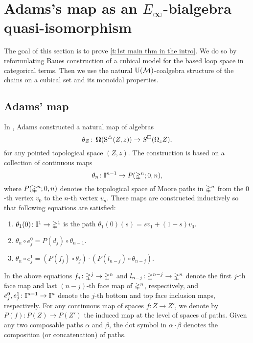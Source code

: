 
\section{Adams's map as an $E_{\infty}$-bialgebra quasi-isomorphism}

The goal of this section is to prove \cref{t:1st main thm in the intro}. We do so by reformulating Baues construction of a cubical model for the based loop space in categorical terms. Then we use the natural ${\operatorname{U}(\mathcal{M})}$-coalgebra structure of the chains on a cubical set and its monoidal properties.


\subsection{Adams' map}

In \cite{adams1956cobar}, Adams constructed a natural map of algebras
\begin{equation} \label{e:adams map 2}
\theta_Z \colon \operatorname{\mathbf{\Omega}}(\operatorname{S^{\triangle}}(Z, z)) \to S^{\square}(\Omega_z Z),
\end{equation}
for any pointed topological space $(Z, z)$.
The construction is based on a collection of continuous maps $$\theta_n \colon \mathbb{I}^{n-1} \to P(\mathbb{\Delta}^n;0,n),$$
where $P(\mathbb{\Delta}^n;0,n)$ denotes the topological space of Moore paths in $\mathbb{\Delta}^n$ from the $0$-th vertex $v_0$ to the $n$-th vertex $v_n$.
These maps are constructed inductively so that following equations are satisfied:
\begin{enumerate}
	\item $\theta_1(0)\colon \mathbb{I}^1 \to \mathbb{\Delta}^1$ is the path $\theta_1(0)(s) = sv_1 +(1-s)v_0$.
	\item $\theta_n \circ e_j^0 = P(d_j) \circ \theta_{n-1}$.
	\item $\theta_n \circ e_j^1 = (P(f_j) \circ \theta_j) \cdot (P(l_{n-j}) \circ \theta_{n-j})$.
\end{enumerate}
In the above equations $f_j\colon \mathbb{\Delta}^j \rightarrow \mathbb{\Delta}^n$ and $l_{n-j}\colon \mathbb{\Delta}^{n-j} \rightarrow \mathbb{\Delta}^n$ denote the first $j$-th face map and last $(n-j)$-th face map of $\mathbb{\Delta}^n$, respectively, and
$e_j^0,e_j^1\colon \mathbb{I}^{n-1} \rightarrow \mathbb{I}^{n}$ denote the $j$-th bottom and top face inclusion maps, respectively.
For any continuous map of spaces $f \colon Z \to Z'$, we denote by $P(f) \colon P(Z) \to P(Z')$ the induced map at the level of spaces of paths. Given any two composable paths $\alpha$ and $\beta$, the dot symbol in $\alpha \cdot \beta$ denotes the composition (or concatenation) of paths.

